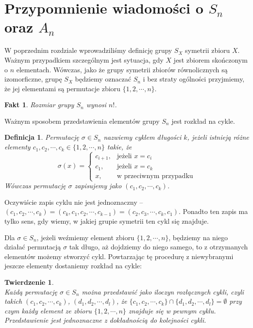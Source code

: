 \documentclass[licencjacka]{pracamgr}
\newtheorem{deff}{Definicja}[section]
\newtheorem{thh}{Twierdzenie}[section]
\newtheorem{fact}{Fakt}[section]
\begin{document}
\section{Przypomnienie wiadomości o $S_n$ oraz $A_n$}

W poprzednim rozdziale wprowadziliśmy definicję grupy $S_X$ symetrii zbioru $X$.
Ważnym przypadkiem szczególnym jest sytuacja, gdy $X$ jest zbiorem skończonym o $n$ elementach.
Wówczas, jako że grupy symetrii zbiorów równolicznych są izomorficzne, 
grupę $S_X$ będziemy oznaczać $S_n$ i bez straty ogólności przyjmiemy, że jej elementami są permutacje zbioru $\{1, 2, \cdots, n\}$.

\begin{fact}
	Rozmiar grupy $S_n$ wynosi $n!$.
\end{fact}

Ważnym sposobem przedstawienia elementów grupy $S_n$ jest rozkład na cykle.

\begin{deff}	%
	Permutację $\sigma \in S_n$ nazwiemy \emph{cyklem długości $k$}, 
	jeżeli istnieją różne elementy $c_1, c_2, \cdots, c_k \in \{1, 2, \cdots, n\}$ takie, że
	$$ \sigma(x) = \left\{ 
				\begin{array}{ll}
					c_{i+1}, & \textrm{jeżeli $x = c_i$}\\
					c_1,     & \textrm{jeżeli $x = c_k$}\\
					x,       & \textrm{w przeciwnym przypadku}
				\end{array} \right.
	$$
	Wówczas permutację $\sigma$ zapisujemy jako $(c_1, c_2, \cdots, c_k)$.
\end{deff}

Oczywiście zapis cyklu nie jest jednoznaczny -- $(c_1, c_2, \cdots, c_k) = (c_k, c_1, c_2, \cdots, c_{k-1}) = (c_2, c_3, \cdots, c_k, c_1)$.
Ponadto ten zapis ma tylko sens, gdy wiemy, w jakiej grupie symetrii ten cykl się znajduje.

Dla $\sigma \in S_n$, jeżeli weźmiemy element zbioru $\{1, 2, \cdots, n\}$, będziemy na niego działać permutacją $\sigma$ tak długo, 
aż dojdziemy do niego samego, to z otrzymanych elementów możemy stworzyć cykl.
Powtarzając tę procedurę z niewybranymi jeszcze elementy dostaniemy rozkład na cykle:

\begin{thh} $ $ \\		%
	Każdą permutację $\sigma \in S_n$ można przedstawić jako iloczyn rozłącznych cykli, 
	czyli takich $(c_1, c_2, \cdots, c_k)$, $(d_1, d_2, \cdots, d_l)$, że $\{ c_1, c_2, \cdots, c_k \} \cap \{ d_1, d_2, \cdots, d_l \} = \emptyset$
	przy czym każdy element ze zbioru $\{1, 2, \cdots, n\}$ znajduje się w pewnym cyklu.
	Przedstawienie jest jednoznaczne z dokładnością do kolejności cykli.
\end{thh}
\end{document}
